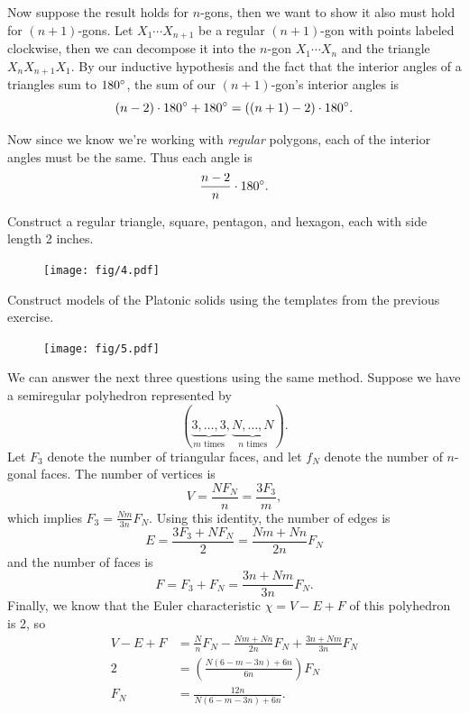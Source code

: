 \documentclass[twoside,10pt]{article}
\begin{document}
Now suppose the result holds for $n$-gons, then we want to show it also must hold for $(n+1)$-gons. Let $X_1\cdots X_{n+1}$ be a regular $(n+1)$-gon with points labeled clockwise, then we can decompose it into the $n$-gon $X_1\cdots X_{n}$ and the triangle $X_{n}X_{n+1}X_1$. By our inductive hypothesis and the fact that the interior angles of a triangles sum to $180^\circ$, the sum of our $(n+1)$-gon's interior angles is
\[
        (n-2) \cdot 180^\circ + 180^\circ = \left( (n+1)-2 \right) \cdot 180^\circ.
\] 

Now since we know we're working with \textit{regular} polygons, each of the interior angles must be the same. Thus each angle is
\[
\frac{n-2}{n} \cdot 180^\circ.
\] 

\newpage

\begin{exer}[5.4]
Construct a regular triangle, square, pentagon, and hexagon, each with side length 2 inches.
\end{exer}

\begin{figure}[H]
	\centering
	\texttt{[image: fig/4.pdf]}
\end{figure}

\begin{exer}[5.5]
Construct models of the Platonic solids using the templates from the previous exercise.
\end{exer}

\begin{figure}[H]
	\centering
	\texttt{[image: fig/5.pdf]}
\end{figure}

\newpage

We can answer the next three questions using the same method. Suppose we have a semiregular polyhedron represented by
\[
	(\underbrace{3, \dots, 3}_{m \text{ times}}, \underbrace{N, \dots, N}_{n \text{ times}}).
\] 
Let $F_{3}$ denote the number of triangular faces, and let $f_{N}$ denote the number of $n$-gonal faces. The number of vertices is
\[
	V = \frac{N F_{N}}{n} = \frac{3F_3}{m} ,
\] which implies $F_{3} = \frac{Nm}{3n} F_{N}$. Using this identity, the number of edges is
\[
E = \frac{3F_3+NF_{N}}{2} = \frac{Nm+Nn}{2n} F_{N}
\] and the number of faces is
\[
F = F_3 + F_N = \frac{3n+Nm}{3n} F_{N}.
\] Finally, we know that the Euler characteristic $\chi = V-E+F$ of this polyhedron is 2, so
\begin{align*}
	V-E+F &= \frac{N}{n}F_{N} - \frac{Nm+Nn}{2n} F_{N} + \frac{3n+Nm}{3n} F_{N} \\
	    2 &= \left( \frac{N(6-m-3n)+6n}{6n}  \right)F_{N} \\
	    F_{N} &= \frac{12n}{N(6-m-3n)+6n} .
\end{align*}
\end{document}
